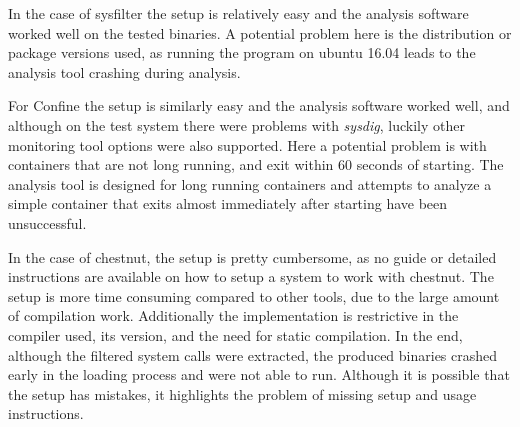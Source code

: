 In the case of sysfilter the setup is relatively easy and the analysis software worked well on the tested binaries. A potential problem here is the distribution or package versions used, as running the program on ubuntu 16.04 leads to the analysis tool crashing during analysis.

For Confine the setup is similarly easy and the analysis software worked well, and although on the test system there were problems with \textit{sysdig}, luckily other monitoring tool options were also supported.
Here a potential problem is with containers that are not long running, and exit within 60 seconds of starting. The analysis tool is designed for long running containers and attempts to analyze a simple container that exits almost immediately after starting have been unsuccessful.

In the case of chestnut, the setup is pretty cumbersome, as no guide or detailed instructions are available on how to setup a system to work with chestnut.
The setup is more time consuming compared to other tools, due to the large amount of compilation work.
Additionally the implementation is restrictive in the compiler used, its version, and the need for static compilation.
In the end, although the filtered system calls were extracted, the produced binaries crashed early in the loading process and were not able to run.
Although it is possible that the setup has mistakes, it highlights the problem of missing setup and usage instructions.
